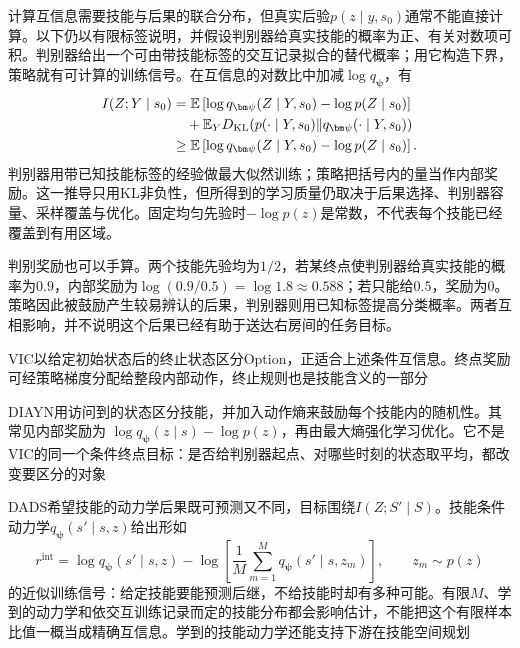 计算互信息需要技能与后果的联合分布，但真实后验$p(z\mid y,s_0)$通常不能直接计算。以下仍以有限标签说明，并假设判别器给真实技能的概率为正、有关对数项可积。判别器给出一个可由带技能标签的交互记录拟合的替代概率；用它构造下界，策略就有可计算的训练信号。在互信息的对数比中加减$\log q_{\bm\psi}$，有
\begin{align}
 I(Z;Y\mid s_0)
   &=\mathbb E\left[\log q_{\bm\psi}(Z\mid Y,s_0)
                                  -\log p(Z\mid s_0)\right]\notag\\
   &\quad+\mathbb E_Y D_{\mathrm{KL}}
       (p(\cdot\mid Y,s_0)\|q_{\bm\psi}(\cdot\mid Y,s_0))\notag\\
   &\geq\mathbb E\left[\log q_{\bm\psi}(Z\mid Y,s_0)
                                  -\log p(Z\mid s_0)\right].
 \label{eq:rl-learning-skill-mi}
\end{align}
判别器用带已知技能标签的经验做最大似然训练；策略把括号内的量当作内部奖励。这一推导只用KL非负性，但所得到的学习质量仍取决于后果选择、判别器容量、采样覆盖与优化。固定均匀先验时$-\log p(z)$是常数，不代表每个技能已经覆盖到有用区域。

判别奖励也可以手算。两个技能先验均为$1/2$，若某终点使判别器给真实技能的概率为$0.9$，内部奖励为$\log(0.9/0.5)=\log1.8\approx0.588$；若只能给$0.5$，奖励为0。策略因此被鼓励产生较易辨认的后果，判别器则用已知标签提高分类概率。两者互相影响，并不说明这个后果已经有助于送达右房间的任务目标。

VIC以给定初始状态后的终止状态区分Option，正适合上述条件互信息。终点奖励可经策略梯度分配给整段内部动作，终止规则也是技能含义的一部分

DIAYN用访问到的状态区分技能，并加入动作熵来鼓励每个技能内的随机性。其常见内部奖励为
$\log q_{\bm\psi}(z\mid s)-\log p(z)$，再由最大熵强化学习优化。它不是VIC的同一个条件终点目标：是否给判别器起点、对哪些时刻的状态取平均，都改变要区分的对象

DADS希望技能的动力学后果既可预测又不同，目标围绕$I(Z;S'\mid S)$。技能条件动力学$q_{\bm\psi}(s'\mid s,z)$给出形如
\[
 r^{\mathrm{int}}
   =\log q_{\bm\psi}(s'\mid s,z)
    -\log\left[\frac{1}{M}\sum_{m=1}^{M}
                      q_{\bm\psi}(s'\mid s,z_m)\right],
       \qquad z_m\sim p(z)
\]
的近似训练信号：给定技能要能预测后继，不给技能时却有多种可能。有限$M$、学到的动力学和依交互训练记录而定的技能分布都会影响估计，不能把这个有限样本比值一概当成精确互信息。学到的技能动力学还能支持下游在技能空间规划

